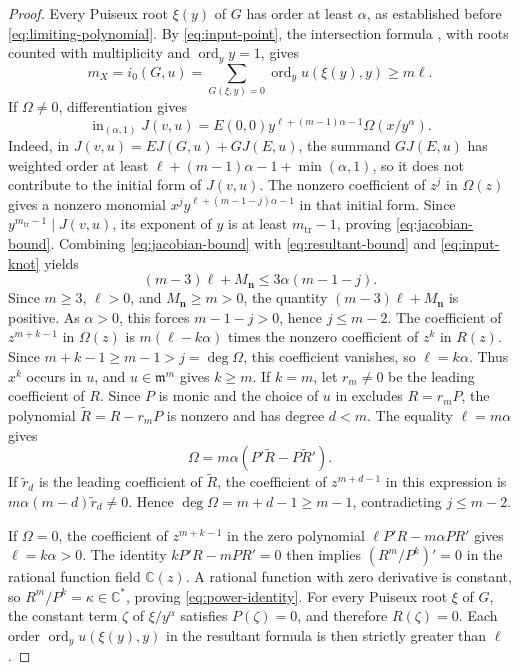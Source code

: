 \documentclass[11pt,letterpaper]{article}
\numberwithin{equation}{section}
\theoremstyle{remark}
\theoremstyle{plain}
\newcommand{\C}{\mathbb{C}}
\newcommand{\ord}{\operatorname{ord}}
\begin{document}
\begin{proof}
Every Puiseux root $\xi(y)$ of $G$ has order at least $\alpha$,
as established before \eqref{eq:limiting-polynomial}.
By \eqref{eq:input-point}, the intersection formula
\cite[Lemma~1.2.1(ii)--(iii)]{Wall}, with roots counted with multiplicity and
$\ord_y y=1$, gives
\[
 m_X=i_0(G,u)=\sum_{G(\xi,y)=0}\ord_y u(\xi(y),y)\geq m\ell.
\]
If $\Omega\neq0$, differentiation gives
\[
 \operatorname{in}_{(\alpha,1)}J(v,u)
 =E(0,0)y^{\ell+(m-1)\alpha-1}\Omega(x/y^\alpha).
\]
Indeed, in $J(v,u)=EJ(G,u)+GJ(E,u)$, the summand $GJ(E,u)$ has
weighted order at least
$\ell+(m-1)\alpha-1+\min(\alpha,1)$, so it does not contribute
to the initial form of $J(v,u)$.
The nonzero coefficient of $z^j$ in $\Omega(z)$ gives a nonzero
monomial $x^jy^{\ell+(m-1-j)\alpha-1}$ in that initial form.
Since $y^{m_{\mathrm{tr}}-1}\mid J(v,u)$, its exponent of $y$
is at least $m_{\mathrm{tr}}-1$, proving \eqref{eq:jacobian-bound}.
Combining \eqref{eq:jacobian-bound}
with \eqref{eq:resultant-bound} and \eqref{eq:input-knot} yields
\[
 (m-3)\ell+M_{\boldsymbol n}\leq3\alpha(m-1-j).
\]
Since $m\geq3$, $\ell>0$, and $M_{\boldsymbol n}\geq m>0$,
the quantity $(m-3)\ell+M_{\boldsymbol n}$ is positive.
As $\alpha>0$, this forces $m-1-j>0$, hence $j\leq m-2$.
The coefficient of $z^{m+k-1}$ in $\Omega(z)$ is
$m(\ell-k\alpha)$ times the nonzero coefficient of $z^k$ in $R(z)$.
Since $m+k-1\geq m-1>j=\deg\Omega$, this coefficient vanishes,
so $\ell=k\alpha$.
Thus $x^k$ occurs in $u$, and $u\in\mathfrak m^m$ gives $k\geq m$.
If $k=m$, let $r_m\neq0$ be the leading coefficient of $R$.
Since $P$ is monic and the choice of $u$ in  excludes
$R=r_mP$, the polynomial $\widetilde R=R-r_mP$ is nonzero and
has degree $d<m$.  The equality $\ell=m\alpha$ gives
\[
 \Omega=m\alpha(P'\widetilde R-P\widetilde R').
\]
If $\widetilde r_d$ is the leading coefficient of $\widetilde R$,
the coefficient of $z^{m+d-1}$ in this expression is
$m\alpha(m-d)\widetilde r_d\neq0$.
Hence $\deg\Omega=m+d-1\geq m-1$, contradicting $j\leq m-2$.

If $\Omega=0$, the coefficient of $z^{m+k-1}$ in the zero
polynomial $\ell P'R-m\alpha PR'$ gives $\ell=k\alpha>0$.
The identity $kP'R-mPR'=0$ then implies
$(R^m/P^k)'=0$ in the rational function field $\C(z)$.
A rational function with zero derivative is constant, so
$R^m/P^k=\kappa\in\C^*$, proving \eqref{eq:power-identity}.
For every Puiseux root $\xi$ of $G$, the constant term
$\zeta$ of $\xi/y^\alpha$ satisfies $P(\zeta)=0$, and
therefore $R(\zeta)=0$.  Each order $\ord_y u(\xi(y),y)$ in the
resultant formula is then strictly greater than $\ell$.
\end{proof}
\end{document}
